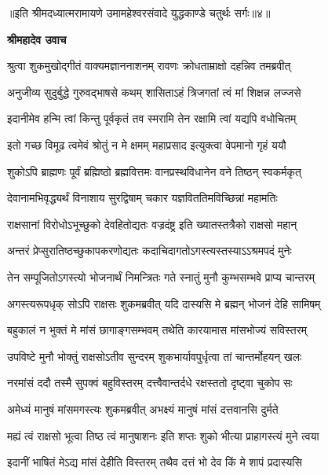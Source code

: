 {॥इति श्रीमदध्यात्मरामायणे उमामहेश्वरसंवादे युद्धकाण्डे
चतुर्थः सर्गः॥४॥
}




\textbf{श्रीमहादेव उवाच}

\twolineshloka
{श्रुत्वा शुकमुखोद्गीतं वाक्यमज्ञाननाशनम्}
{रावणः क्रोधताम्राक्षो दहन्निव तमब्रवीत्} %

\twolineshloka
{अनुजीव्य सुदुर्बुद्धे गुरुवद्भाषसे कथम्}
{शासिताऽहं त्रिजगतां त्वं मां शिक्षन्न लज्जसे} %

\twolineshloka
{इदानीमेव हन्मि त्वां किन्तु पूर्वकृतं तव}
{स्मरामि तेन रक्षामि त्वां यद्यपि वधोचितम्} %

\twolineshloka
{इतो गच्छ विमूढ त्वमेवं श्रोतुं न मे क्षमम्}
{महाप्रसाद इत्युक्त्वा वेपमानो गृहं ययौ} %

\twolineshloka
{शुकोऽपि ब्राह्मणः पूर्वं ब्रह्मिष्ठो ब्रह्मवित्तमः}
{वानप्रस्थविधानेन वने तिष्ठन् स्वकर्मकृत्} %

\twolineshloka
{देवानामभिवृद्ध्यर्थं विनाशाय सुरद्विषाम्}
{चकार यज्ञविततिमविच्छिन्नां महामतिः} %

\twolineshloka
{राक्षसानां विरोधोऽभूच्छुको देवहितोद्यतः}
{वज्रदंष्ट्र इति ख्यातस्तत्रैको राक्षसो महान्} %

\twolineshloka
{अन्तरं प्रेप्सुरातिष्ठच्छुकापकरणोद्यतः}
{कदाचिदागतोऽगस्त्यस्तस्याऽऽश्रमपदं मुनेः} %

\twolineshloka
{तेन सम्पूजितोऽगस्त्यो भोजनार्थं निमन्त्रितः}
{गते स्नातुं मुनौ कुम्भसम्भवे प्राप्य चान्तरम्} %

\twolineshloka
{अगस्त्यरूपधृक् सोऽपि राक्षसः शुकमब्रवीत्}
{यदि दास्यसि मे ब्रह्मन् भोजनं देहि सामिषम्} %

\twolineshloka
{बहुकालं न भुक्तं मे मांसं छागाङ्गसम्भवम्}
{तथेति कारयामास मांसभोज्यं सविस्तरम्} %

\twolineshloka
{उपविष्टे मुनौ भोक्तुं राक्षसोऽतीव सुन्दरम्}
{शुकभार्यावपुर्धृत्वा तां चान्तर्मोहयन् खलः} %

\twolineshloka
{नरमांसं ददौ तस्मै सुपक्वं बहुविस्तरम्}
{दत्त्वैवान्तर्दधे रक्षस्ततो दृष्ट्वा चुकोप सः} %

\twolineshloka
{अमेध्यं मानुषं मांसमगस्त्यः शुकमब्रवीत्}
{अभक्ष्यं मानुषं मांसं दत्तवानसि दुर्मते} %

\twolineshloka
{मह्यं त्वं राक्षसो भूत्वा तिष्ठ त्वं मानुषाशनः}
{इति शप्तः शुको भीत्या प्राहागस्त्यं मुने त्वया} %

\twolineshloka
{इदानीं भाषितं मेऽद्य मांसं देहीति विस्तरम्}
{तथैव दत्तं भो देव किं मे शापं प्रदास्यसि} %

